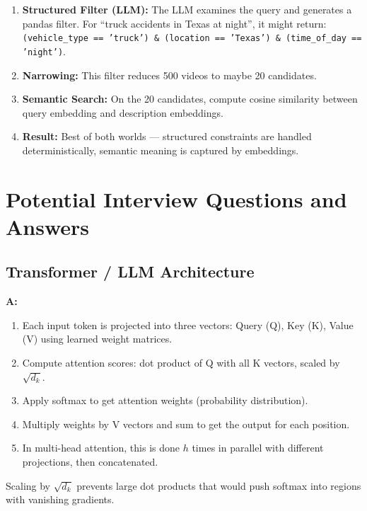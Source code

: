 \documentclass[11pt,a4paper]{article}
\begin{document}
\begin{keybox}
\begin{enumerate}[nosep]
  \item \textbf{Structured Filter (LLM):} The LLM examines the query and generates a pandas filter. For ``truck accidents in Texas at night'', it might return: \texttt{(vehicle\_type == 'truck') \& (location == 'Texas') \& (time\_of\_day == 'night')}.
  \item \textbf{Narrowing:} This filter reduces 500 videos to maybe 20 candidates.
  \item \textbf{Semantic Search:} On the 20 candidates, compute cosine similarity between query embedding and description embeddings.
  \item \textbf{Result:} Best of both worlds --- structured constraints are handled deterministically, semantic meaning is captured by embeddings.
\end{enumerate}
\end{keybox}

\newpage
\section{Potential Interview Questions and Answers}

\subsection{Transformer / LLM Architecture}

\begin{warnbox}
\textbf{A:}
\begin{enumerate}[nosep]
  \item Each input token is projected into three vectors: Query (Q), Key (K), Value (V) using learned weight matrices.
  \item Compute attention scores: dot product of Q with all K vectors, scaled by $\sqrt{d_k}$.
  \item Apply softmax to get attention weights (probability distribution).
  \item Multiply weights by V vectors and sum to get the output for each position.
  \item In multi-head attention, this is done $h$ times in parallel with different projections, then concatenated.
\end{enumerate}
Scaling by $\sqrt{d_k}$ prevents large dot products that would push softmax into regions with vanishing gradients.
\end{warnbox}
\end{document}
